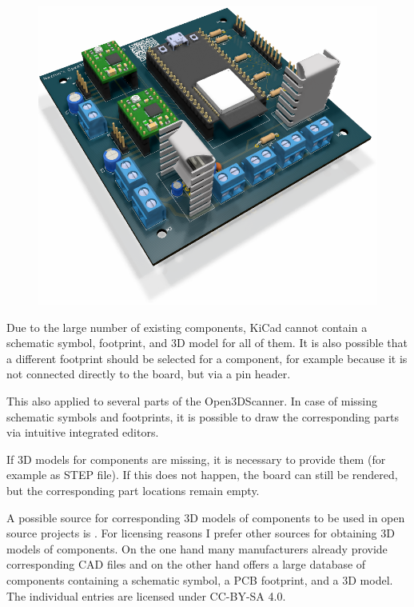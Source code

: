 \begin{figure}[ht!]%
	\includegraphics[width=\linewidth]{images/Render.png}%
\end{figure}%

Due to the large number of existing components, KiCad cannot contain a schematic symbol, footprint, and 3D model for all of them. It is also possible that a different footprint should be selected for a component, for example because it is not connected directly to the board, but via a pin header.%

This also applied to several parts of the Open3DScanner. In case of missing schematic symbols and footprints, it is possible to draw the corresponding parts via intuitive integrated editors.%

If 3D models for components are missing, it is necessary to provide them (for example as STEP file). If this does not happen, the board can still be rendered, but the corresponding part locations remain empty.%

A possible source for corresponding 3D models of components to be used in open source projects is  . For licensing reasons I prefer other sources for obtaining 3D models of components. On the one hand many manufacturers already provide corresponding CAD files and on the other hand  offers a large database of components containing a schematic symbol, a PCB footprint, and a 3D model. The individual entries are licensed under CC-BY-SA 4.0.%

